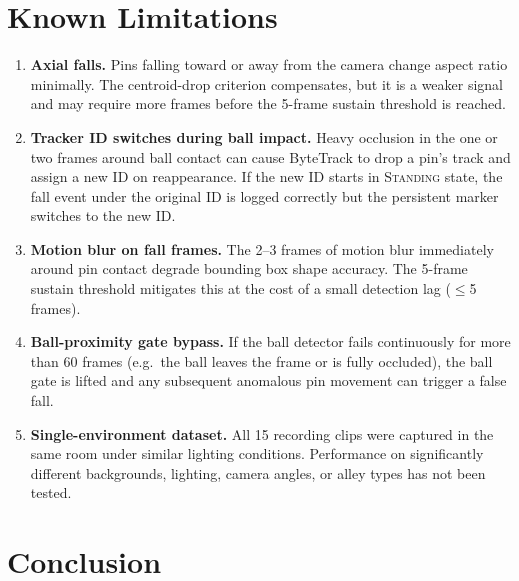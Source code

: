 \documentclass[11pt,a4paper]{article}
\begin{document}
\section{Known Limitations}

\label{sec:limitations}

\begin{enumerate}
  \item \textbf{Axial falls.} Pins falling toward or away from the camera change aspect ratio minimally. The centroid-drop criterion compensates, but it is a weaker signal and may require more frames before the 5-frame sustain threshold is reached.

  \item \textbf{Tracker ID switches during ball impact.} Heavy occlusion in the one or two frames around ball contact can cause ByteTrack to drop a pin's track and assign a new ID on reappearance. If the new ID starts in \textsc{Standing} state, the fall event under the original ID is logged correctly but the persistent marker switches to the new ID.

  \item \textbf{Motion blur on fall frames.} The 2--3 frames of motion blur immediately around pin contact degrade bounding box shape accuracy. The 5-frame sustain threshold mitigates this at the cost of a small detection lag ($\leq$5 frames).

  \item \textbf{Ball-proximity gate bypass.} If the ball detector fails continuously for more than 60 frames (e.g.\ the ball leaves the frame or is fully occluded), the ball gate is lifted and any subsequent anomalous pin movement can trigger a false fall.

  \item \textbf{Single-environment dataset.} All 15 recording clips were captured in the same room under similar lighting conditions. Performance on significantly different backgrounds, lighting, camera angles, or alley types has not been tested.
\end{enumerate}

\section{Conclusion}

\label{sec:conclusion}
\end{document}
